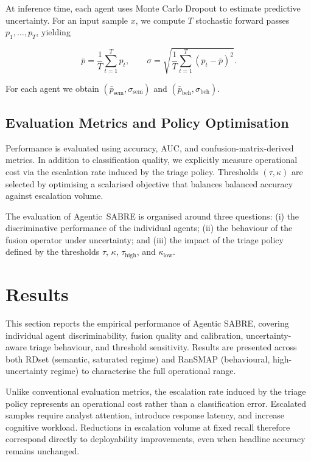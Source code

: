 \documentclass[lettersize,journal]{IEEEtran}
\begin{document}
At inference time, each agent uses Monte Carlo Dropout to estimate predictive
uncertainty. For an input sample $x$, we compute $T$ stochastic forward passes
$p_1, \ldots, p_T$, yielding

\begin{equation}
\bar{p} = \frac{1}{T}\sum_{t=1}^T p_t, \qquad
\sigma = \sqrt{\frac{1}{T}\sum_{t=1}^{T} (p_t - \bar{p})^2}.
\end{equation}

For each agent we obtain $(\bar{p}_{\text{sem}}, \sigma_{\text{sem}})$ and
$(\bar{p}_{\text{beh}}, \sigma_{\text{beh}})$.

\subsection{Evaluation Metrics and Policy Optimisation}

Performance is evaluated using accuracy, AUC, and confusion-matrix-derived
metrics. In addition to classification quality, we explicitly measure
operational cost via the escalation rate induced by the triage policy.
Thresholds $(\tau,\kappa)$ are selected by optimising a scalarised objective
that balances balanced accuracy against escalation volume.

The evaluation of Agentic~SABRE is organised around three questions:  
(i) the discriminative performance of the individual agents;  
(ii) the behaviour of the fusion operator under uncertainty; and  
(iii) the impact of the triage policy defined by the thresholds \(\tau\), \(\kappa\), \(\tau_{\mathrm{high}}\), and \(\kappa_{\mathrm{low}}\).

\section{Results}
\label{sec:results}


\cbstart
This section reports the empirical performance of Agentic SABRE, covering individual agent
discriminability, fusion quality and calibration, uncertainty-aware triage behaviour, and
threshold sensitivity. Results are presented across both RDset (semantic, saturated regime)
and RanSMAP (behavioural, high-uncertainty regime) to characterise the full operational range.
\cbend


Unlike conventional evaluation metrics, the escalation rate induced by the triage policy represents an operational cost rather than a classification error. Escalated samples require analyst attention, introduce response latency, and increase cognitive workload. Reductions in escalation volume at fixed recall therefore correspond directly to deployability improvements, even when headline accuracy remains unchanged.
\end{document}
